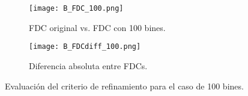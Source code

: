 \begin{figure}[H]
    \centering
    \begin{subfigure}[b]{0.46\textwidth}
        \texttt{[image: B\_FDC\_100.png]}
        \caption{FDC original vs. FDC con 100 bines.}
        \label{fig:B_FDC_100}
    \end{subfigure}
    \hfill
    \begin{subfigure}[b]{0.46\textwidth}
        \texttt{[image: B\_FDCdiff\_100.png]}
        \caption{Diferencia absoluta entre FDCs.}
        \label{fig:B_FDCdiff_100}
    \end{subfigure}
    \caption{Evaluación del criterio de refinamiento para el caso de 100 bines.}
    \label{fig:B_FDC_100_100}
\end{figure}





